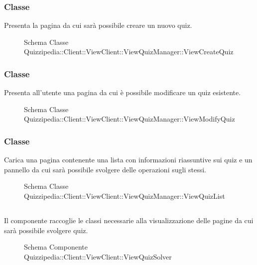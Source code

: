 \subsubsection{Classe }
Presenta la pagina da cui sarà possibile creare un nuovo quiz.
\begin{figure}[H]
\centering
\noindent{}
\caption[Schema Classe ViewCreateQuiz]{Schema Classe Quizzipedia::Client::ViewClient::ViewQuizManager::ViewCreateQuiz}
\end{figure}
\subsubsection{Classe }
Presenta all'utente una pagina da cui è possibile modificare un quiz esistente.
\begin{figure}[H]
\centering
\noindent{}
\caption[Schema Classe ViewModifyQuiz]{Schema Classe Quizzipedia::Client::ViewClient::ViewQuizManager::ViewModifyQuiz}
\end{figure}
\subsubsection{Classe }
Carica una pagina contenente una lista con informazioni riassuntive sui quiz e un pannello da cui sarà possibile svolgere delle operazioni sugli stessi.
\begin{figure}[H]
\centering
\noindent{}
\caption[Schema Classe ViewQuizList]{Schema Classe Quizzipedia::Client::ViewClient::ViewQuizManager::ViewQuizList}
\end{figure}
\subsection{}
Il componente raccoglie le classi necessarie alla visualizzazione delle pagine da cui sarà possibile svolgere quiz.
\begin{figure}[H]
\centering
\noindent{}
\caption[Schema Componente Quizzipedia::Client::ViewClient::ViewQuizSolver]{Schema Componente Quizzipedia::Client::ViewClient::ViewQuizSolver}
\end{figure}
